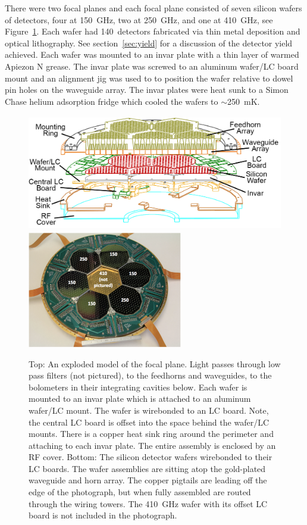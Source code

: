 
There were two focal planes and each focal plane consisted of seven silicon wafers of detectors, four at 150~GHz, two at 250~GHz, and one at 410~GHz, see Figure~\ref{fig:focal_plane}.
Each wafer had 140~detectors fabricated via thin metal deposition and optical lithography. 
See section~\ref{sec:yield} for a discussion of the detector yield achieved.  
Each wafer was mounted to an invar plate with a thin layer of warmed Apiezon N grease. 
The invar plate was screwed to an aluminum wafer/LC board mount and an alignment jig was used to to position the wafer relative to dowel pin holes on the waveguide array. 
The invar plates were heat sunk to a Simon Chase helium adsorption fridge which cooled the wafers to $\sim$250~mK.  

\begin{figure}[htbp]
\begin{center}
\includegraphics[height=2.0in]{figures/focal_plane_outline_central_labeled.png}
\includegraphics[height=2.0in]{figures/focal_plane_photo.png}
\caption[EBEX focal plane]{Top: An exploded model of the focal plane. Light passes through low pass filters (not pictured), to the feedhorns and waveguides, to the bolometers in their integrating cavities below. Each wafer is mounted to an invar plate which is attached to an aluminum wafer/\ac{LC} mount. The wafer is wirebonded to an \ac{LC} board. Note, the central \ac{LC} board is offset into the space behind the wafer/\ac{LC} mounts. There is a copper heat sink ring around the perimeter and attaching to each invar plate. The entire assembly is enclosed by an RF cover. Bottom: The silicon detector wafers wirebonded to their \ac{LC} boards. The wafer assemblies are sitting atop the gold-plated waveguide and horn array. The copper pigtails are leading off the edge of the photograph, but when fully assembled are routed through the wiring towers. The 410~GHz wafer with its offset \ac{LC} board is not included in the photograph. 
\label{fig:focal_plane} }
\end{center}
\end{figure}

